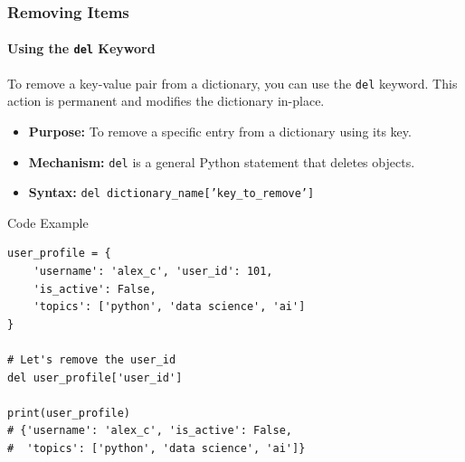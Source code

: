 \documentclass{beamer}
\begin{document}
\begin{frame}[fragile]
    \frametitle{Removing Items}
    \framesubtitle{Using the \texttt{del} Keyword}

    To remove a key-value pair from a dictionary, you can use the \texttt{del} keyword. This action is permanent and modifies the dictionary in-place.

    \begin{itemize}
        \item \textbf{Purpose:} To remove a specific entry from a dictionary using its key.
        \item \textbf{Mechanism:} \texttt{del} is a general Python statement that deletes objects.
        \item \textbf{Syntax:} \texttt{del dictionary\_name['key\_to\_remove']}
    \end{itemize}

    \begin{block}{Code Example}
\begin{verbatim}
user_profile = {
    'username': 'alex_c', 'user_id': 101, 
    'is_active': False, 
    'topics': ['python', 'data science', 'ai']
}

# Let's remove the user_id
del user_profile['user_id']

print(user_profile)
# {'username': 'alex_c', 'is_active': False, 
#  'topics': ['python', 'data science', 'ai']}
\end{verbatim}
    \end{block}
\end{frame}
\end{document}
